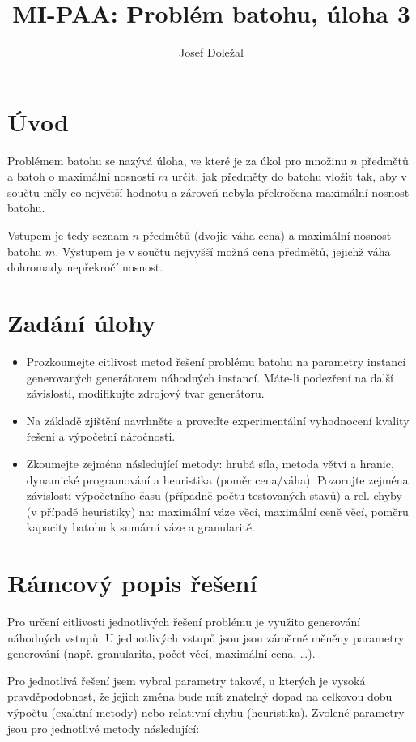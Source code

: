 \documentclass{article}
\title{MI-PAA: Problém batohu, úloha 3}
\author{Josef Doležal}
\begin{document}
\maketitle

\section{Úvod}
Problémem batohu se nazývá úloha, ve které je za úkol pro množinu $n$ předmětů a batoh o maximální nosnosti $m$ určit, jak předměty do batohu vložit tak, aby v součtu měly co největší hodnotu a zároveň nebyla překročena maximální nosnost batohu.

Vstupem je tedy seznam $n$ předmětů (dvojic váha-cena) a maximální nosnost batohu $m$.
Výstupem je v součtu nejvyšší možná cena předmětů, jejichž váha dohromady nepřekročí nosnost.

\section{Zadání úlohy}

\begin{itemize}
    \item Prozkoumejte citlivost metod řešení problému batohu na parametry instancí generovaných generátorem náhodných instancí. Máte-li podezření na další závislosti, modifikujte zdrojový tvar generátoru.
    \item Na základě zjištění navrhněte a proveďte experimentální vyhodnocení kvality řešení a výpočetní náročnosti.
    \item Zkoumejte zejména následující metody: hrubá síla, metoda větví a hranic, dynamické programování a heuristika (poměr cena/váha).
    Pozorujte zejména závislosti výpočetního času (případně počtu testovaných stavů) a rel. chyby (v případě heuristiky) na: maximální váze věcí, maximální ceně věcí, poměru kapacity batohu k sumární váze a granularitě.
\end{itemize}

\section{Rámcový popis řešení}

Pro určení citlivosti jednotlivých řešení problému je využito generování náhodných vstupů.
U jednotlivých vstupů jsou jsou záměrně měněny parametry generování (např. granularita, počet věcí, maximální cena, \ldots).

Pro jednotlivá řešení jsem vybral parametry takové, u kterých je vysoká pravděpodobnost, že jejich změna bude mít znatelný dopad na celkovou dobu výpočtu (exaktní metody) nebo relativní chybu (heuristika).
Zvolené parametry jsou pro jednotlivé metody následující:
\end{document}
